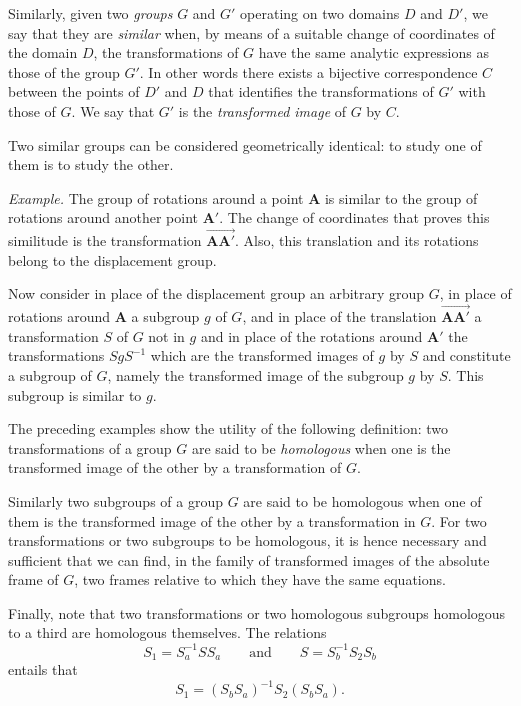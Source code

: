 \somespace

Similarly, given two \emph{groups} $G$ and $G'$ operating on two domains $D$ and $D'$, we say that they are \emph{similar} when, by means of a suitable change of coordinates of the domain $D$, the transformations of $G$ have the same analytic expressions as those of the group $G'$. In other words there exists a bijective correspondence $C$ between the points of $D'$ and $D$ that identifies the transformations of $G'$ with those of $G$. We say that $G'$ is the \emph{transformed image} of $G$ by $C$.

Two similar groups can be considered geometrically identical: to study one of them is to study the other.

\somespace

{\small
\emph{Example.} The group of rotations around a point $\mathbf{A}$ is similar to the group of rotations around another point $\mathbf{A}'$. The change of coordinates that proves this similitude is the transformation $\overrightarrow{\mathbf{AA}'}$. Also, this translation and its rotations belong to the displacement group.

Now consider in place of the displacement group an arbitrary group $G$, in place of rotations around $\mathbf{A}$ a subgroup $g$ of $G$, and in place of the translation $\overrightarrow{\mathbf{AA}'}$ a transformation $S$ of $G$ not in $g$ and in place of the rotations around $\mathbf{A}'$ the transformations $SgS^{-1}$ which are the transformed images of $g$ by $S$ and constitute a subgroup of $G$, namely the transformed image of the subgroup $g$ by $S$. This subgroup is similar to $g$.
}

\somespace

The preceding examples show the utility of the following definition: two transformations of a group $G$ are said to be \emph{homologous} when one is the transformed image of the other by a transformation of $G$.

Similarly two subgroups of a group $G$ are said to be homologous when one of them is the transformed image of the other by a transformation in $G$. For two transformations or two subgroups to be homologous, it is hence necessary and sufficient that we can find, in the family of transformed images of the absolute frame of $G$, two frames relative to which they have the same equations.

Finally, note that two transformations or two homologous subgroups homologous to a third are homologous themselves. The relations
\[
S_{1}=S_{a}^{-1}SS_{a}\qquad\text{and}\qquad S=S_{b}^{-1}S_{2}S_{b}
\]
entails that
\[
S_{1}=(S_{b}S_{a})^{-1}S_{2}(S_{b}S_{a}).
\]

